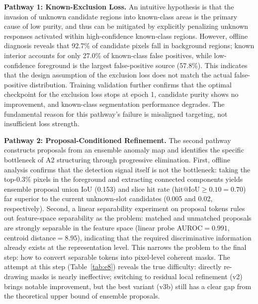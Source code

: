 \documentclass[3p,twocolumn,authoryear]{elsarticle}
\begin{document}
\textbf{Pathway 1: Known-Exclusion Loss.}
An intuitive hypothesis is that the invasion of unknown candidate regions into known-class
areas is the primary cause of low purity, and thus can be mitigated by explicitly
penalizing unknown responses activated within high-confidence known-class regions.
However, offline diagnosis reveals that 92.7\% of candidate pixels fall in background
regions; known interior accounts for only 27.0\% of known-class false positives,
while low-confidence foreground is the largest false-positive source (57.8\%).
This indicates that the design assumption of the exclusion loss does not match the
actual false-positive distribution.
Training validation further confirms that the optimal checkpoint for the exclusion loss
stops at epoch 1, candidate purity shows no improvement, and known-class segmentation
performance degrades.
The fundamental reason for this pathway's failure is misaligned targeting, not
insufficient loss strength.

\textbf{Pathway 2: Proposal-Conditioned Refinement.}
The second pathway constructs proposals from an ensemble anomaly map and identifies
the specific bottleneck of A2 structuring through progressive elimination.
First, offline analysis confirms that the detection signal itself is not the bottleneck:
taking the top-0.3\% pixels in the foreground and extracting connected components yields
ensemble proposal union IoU (0.153) and slice hit rate ($\text{hit@IoU}{\geq}0.10=0.70$)
far superior to the current unknown-slot candidates (0.005 and 0.02, respectively).
Second, a linear separability experiment on proposal tokens rules out feature-space
separability as the problem: matched and unmatched proposals are strongly separable in
the feature space (linear probe AUROC$=0.991$, centroid distance$=8.95$), indicating
that the required discriminative information already exists at the representation level.
This narrows the problem to the final step: how to convert separable tokens into
pixel-level coherent masks.
The attempt at this step (Table~\ref{tab:e8}) reveals the true difficulty:
directly re-drawing masks is nearly ineffective; switching to residual local
refinement (v2) brings notable improvement, but the best variant (v3b) still
has a clear gap from the theoretical upper bound of ensemble proposals.

\begin{table}[h]
\centering
\caption{Comparison of proposal-conditioned refinement variants against the ensemble proposal upper bound (A2, Synapse).}
\label{tab:e8}
%
\end{table}
\end{document}
